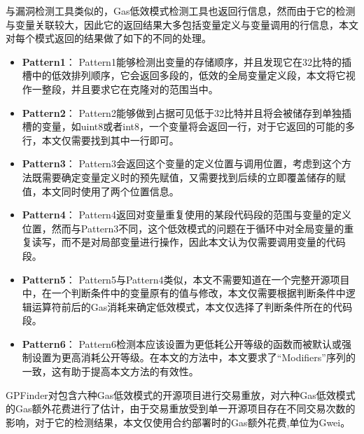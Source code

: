 与漏洞检测工具类似的，Gas低效模式检测工具也返回行信息，然而由于它的检测与变量关联较大，因此它的返回结果大多包括变量定义与变量调用的行信息，本文对每个模式返回的结果做了如下的不同的处理。
\begin{itemize}

    \item \textbf{Pattern1}： Pattern1能够检测出变量的存储顺序，并且发现它在32比特的插槽中的低效排列顺序，它会返回多段的，低效的全局变量定义段，本文将它视作一整段，并且要求它在克隆对的范围当中。
    
    \item \textbf{Pattern2}： Pattern2能够做到占据可见低于32比特并且将会被储存到单独插槽的变量，如uint8或者int8，一个变量将会返回一行，对于它返回的可能的多行，本文仅需要找到其中一行即可。
    
    \item \textbf{Pattern3}： Pattern3会返回这个变量的定义位置与调用位置，考虑到这个方法既需要确定变量定义时的预先赋值，又需要找到后续的立即覆盖储存的赋值，本文同时使用了两个位置信息。
    
    \item \textbf{Pattern4}： Pattern4返回对变量重复使用的某段代码段的范围与变量的定义位置，然而与Pattern3不同，这个低效模式的问题在于循环中对全局变量的重复读写，而不是对局部变量进行操作，因此本文认为仅需要调用变量的代码段。
    
    \item \textbf{Pattern5}： Pattern5与Pattern4类似，本文不需要知道在一个完整开源项目中，在一个判断条件中的变量原有的值与修改，本文仅需要根据判断条件中逻辑运算符前后的Gas消耗来确定低效模式，本文仅选择了判断条件所在的代码段。
    
    \item \textbf{Pattern6}： Pattern6检测本应该设置为更低耗公开等级的函数而被默认或强制设置为更高消耗公开等级。在本文的方法中，本文要求了“Modifiers”序列的一致，这有助于提高本文方法的有效性。
    
\end{itemize}

GPFinder\cite{gasPattern}对包含六种Gas低效模式的开源项目进行交易重放，对六种Gas低效模式的Gas额外花费进行了估计，由于交易重放受到单一开源项目存在不同交易次数的影响，对于它的检测结果，本文仅使用合约部署时的Gas额外花费,单位为Gwei。

